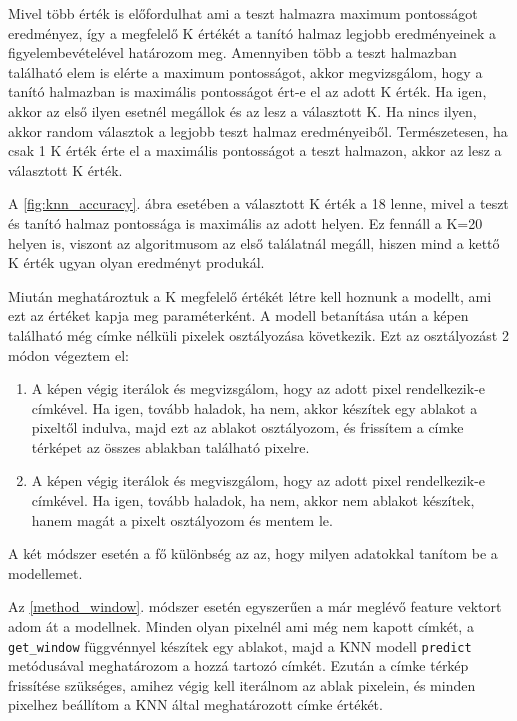 Mivel több érték is előfordulhat ami a teszt halmazra maximum pontosságot eredményez, így a megfelelő K értékét a tanító halmaz legjobb eredményeinek a figyelembevételével határozom meg. Amennyiben több a teszt halmazban található elem is elérte a maximum pontosságot, akkor megvizsgálom, hogy a tanító halmazban is maximális pontosságot ért-e el az adott K érték. Ha igen, akkor az első ilyen esetnél megállok és az lesz a választott K. Ha nincs ilyen, akkor random választok a legjobb teszt halmaz eredményeiből. Természetesen, ha csak 1 K érték érte el a maximális pontosságot a teszt halmazon, akkor az lesz a választott K érték.

A \ref{fig:knn_accuracy}. ábra esetében a választott K érték a 18 lenne, mivel a teszt és tanító halmaz pontossága is maximális az adott helyen. Ez fennáll a K=20 helyen is, viszont az algoritmusom az első találatnál megáll, hiszen mind a kettő K érték ugyan olyan eredményt produkál.

Miután meghatároztuk a K megfelelő értékét létre kell hoznunk a modellt, ami ezt az értéket kapja meg paraméterként. A modell betanítása után a képen található még címke nélküli pixelek osztályozása következik. Ezt az osztályozást 2 módon végeztem el:
\begin{enumerate}
\item \label{method_window} A képen végig iterálok és megvizsgálom, hogy az adott pixel rendelkezik-e címkével. Ha igen, tovább haladok, ha nem, akkor készítek egy ablakot a pixeltől indulva, majd ezt az ablakot osztályozom, és frissítem a címke térképet az összes ablakban található pixelre.
\item \label{method_pixel} A képen végig iterálok és megviszgálom, hogy az adott pixel rendelkezik-e címkével. Ha igen, tovább haladok, ha nem, akkor nem ablakot készítek, hanem magát a pixelt osztályozom és mentem le.
\end{enumerate}

A két módszer esetén a fő különbség az az, hogy milyen adatokkal tanítom be a modellemet.

Az \ref{method_window}. módszer esetén egyszerűen a már meglévő feature vektort adom át a modellnek. Minden olyan pixelnél ami még nem kapott címkét, a \texttt{get\_window} függvénnyel készítek egy ablakot, majd a KNN modell \texttt{predict} metódusával meghatározom a hozzá tartozó címkét. Ezután a címke térkép frissítése szükséges, amihez végig kell iterálnom az ablak pixelein, és minden pixelhez beállítom a KNN által meghatározott címke értékét.

